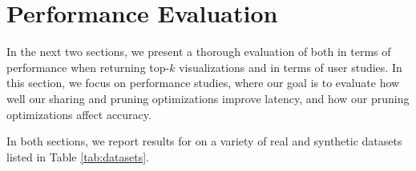 \section{Performance Evaluation}
\label{sec:experiments}
 
In the next two sections, we present a thorough evaluation of \SeeDB both in terms
of performance when returning top-$k$ visualizations and in terms of user 
studies.
In this section, we focus on performance studies, where our goal is to evaluate how well our sharing and pruning
optimizations improve latency, and how our pruning optimizations affect accuracy.

In both sections, we report results for \SeeDB on a variety of real and synthetic datasets listed in Table 
\ref{tab:datasets}.

